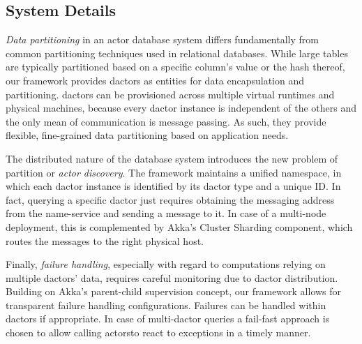    \subsection{System Details}\label{subsec:framework_discussion}
      \emph{Data partitioning} in an actor database system differs fundamentally from common partitioning techniques used in relational databases.
      While large tables are typically partitioned based on a specific column's value or the hash thereof, our framework provides \glspl{dactor} as entities for data encapsulation and partitioning.
      \Glspl{dactor} can be provisioned across multiple virtual runtimes and physical machines, because every \gls{dactor} instance is independent of the others and the only mean of communication is message passing.
      As such, they provide flexible, fine-grained data partitioning based on application needs.
      
      The distributed nature of the database system introduces the new problem of partition or \emph{actor discovery}.
      The framework maintains a unified namespace, in which each \gls{dactor} instance is identified by its \gls{dactor} type and a unique ID.
      In fact, querying a specific \gls{dactor} just requires obtaining the messaging address from the name-service and sending a message to it.
      In case of a multi-node deployment, this is complemented by Akka's Cluster Sharding component, which routes the messages to the right physical host.
      
      Finally, \emph{failure handling}, especially with regard to computations relying on multiple \glspl{dactor}' data, requires careful monitoring due to \gls{dactor} distribution.
      Building on Akka's parent-child supervision concept, our framework allows for transparent failure handling configurations.
      Failures can be handled within \glspl{dactor} if appropriate.
      In case of multi-\gls{dactor} queries a fail-fast approach is chosen to allow calling actorsto react to exceptions in a timely manner.